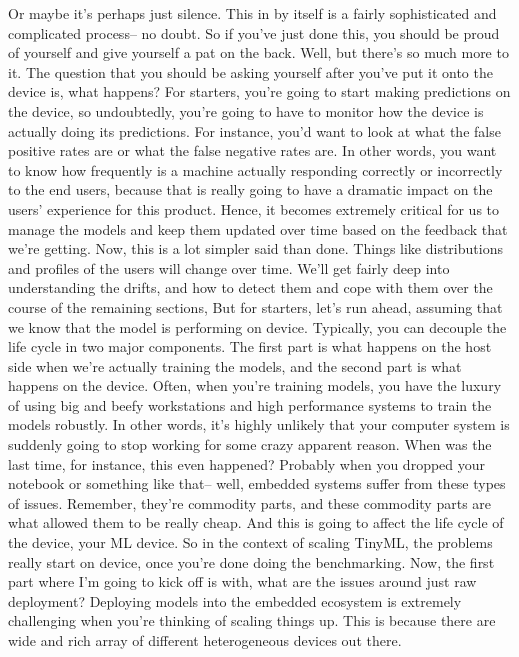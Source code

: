 Or maybe it's perhaps just silence.
This in by itself is a fairly sophisticated and complicated process--
no doubt.
So if you've just done this, you should be proud of yourself
and give yourself a pat on the back.
Well, but there's so much more to it.
The question that you should be asking yourself after you've put it
onto the device is, what happens?
For starters, you're going to start making predictions on the device,
so undoubtedly, you're going to have to monitor how the device is actually
doing its predictions.
For instance, you'd want to look at what the false positive rates are
or what the false negative rates are.
In other words, you want to know how frequently is a machine actually
responding correctly or incorrectly to the end users,
because that is really going to have a dramatic impact on the users'
experience for this product.
Hence, it becomes extremely critical for us to manage the models
and keep them updated over time based on the feedback that we're getting.
Now, this is a lot simpler said than done.
Things like distributions and profiles of the users will change over time.
We'll get fairly deep into understanding the drifts,
and how to detect them and cope with them over the course of the remaining
sections, But for starters, let's run ahead,
assuming that we know that the model is performing on device.
Typically, you can decouple the life cycle in two major components.
The first part is what happens on the host side
when we're actually training the models, and the second part
is what happens on the device.
Often, when you're training models, you have the luxury
of using big and beefy workstations and high performance systems
to train the models robustly.
In other words, it's highly unlikely that your computer system is suddenly
going to stop working for some crazy apparent reason.
When was the last time, for instance, this even happened?
Probably when you dropped your notebook or something like that--
well, embedded systems suffer from these types of issues.
Remember, they're commodity parts, and these commodity parts
are what allowed them to be really cheap.
And this is going to affect the life cycle of the device, your ML device.
So in the context of scaling TinyML, the problems
really start on device, once you're done doing the benchmarking.
Now, the first part where I'm going to kick off
is with, what are the issues around just raw deployment?
Deploying models into the embedded ecosystem
is extremely challenging when you're thinking of scaling things up.
This is because there are wide and rich array
of different heterogeneous devices out there.
